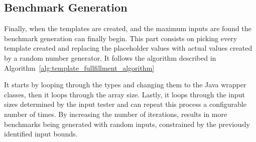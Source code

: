 \subsection{Benchmark Generation} \label{sec:work_stage1_program_generation}

Finally, when the templates are created, and the maximum inputs are found the benchmark generation can finally begin. This part consists on picking every template created and replacing the placeholder values with actual values created by a random number generator. It follows the algorithm described in Algorithm~\ref{alg:template_fullfillment_algorithm}

It starts by looping through the types and changing them to the Java wrapper classes, then it loops through the array size. Lastly, it loops through the input sizes determined by the input tester and can repeat this process a configurable number of times. By increasing the number of iterations, results in more benchmarks being generated with random inputs, constrained by the previously identified input bounds. 




